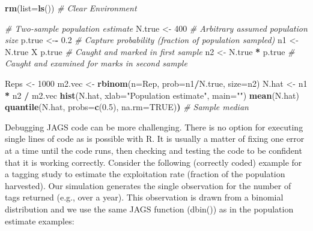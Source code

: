 \documentclass[
]{krantz}
\makeatletter
\newenvironment{Shaded}{\begin{snugshade}}{\end{snugshade}}
\newcommand{\AttributeTok}[1]{\textcolor[rgb]{0.27,0.27,0.27}{#1}}
\newcommand{\CommentTok}[1]{\textcolor[rgb]{0.37,0.37,0.37}{\textit{#1}}}
\newcommand{\ConstantTok}[1]{\textcolor[rgb]{0.37,0.37,0.37}{#1}}
\newcommand{\DecValTok}[1]{\textcolor[rgb]{0.06,0.06,0.06}{#1}}
\newcommand{\ErrorTok}[1]{\textcolor[rgb]{0.14,0.14,0.14}{\textbf{#1}}}
\newcommand{\FloatTok}[1]{\textcolor[rgb]{0.06,0.06,0.06}{#1}}
\newcommand{\FunctionTok}[1]{\textcolor[rgb]{0.27,0.27,0.27}{\textbf{#1}}}
\newcommand{\NormalTok}[1]{#1}
\newcommand{\OtherTok}[1]{\textcolor[rgb]{0.37,0.37,0.37}{#1}}
\newcommand{\SpecialCharTok}[1]{\textcolor[rgb]{0.43,0.43,0.43}{\textbf{#1}}}
\newcommand{\StringTok}[1]{\textcolor[rgb]{0.5,0.5,0.5}{#1}}
\newenvironment{kframe}{%
\medskip{}
\setlength{\fboxsep}{.8em}
 \def\at@end@of@kframe{}%
 \ifinner\ifhmode%
  \def\at@end@of@kframe{\end{minipage}}%
  \begin{minipage}{\columnwidth}%
 \fi\fi%
 \def\FrameCommand##1{\hskip\@totalleftmargin \hskip-\fboxsep
 \colorbox{shadecolor}{##1}\hskip-\fboxsep
     \hskip-\linewidth \hskip-\@totalleftmargin \hskip\columnwidth}%
 \MakeFramed {\advance\hsize-\width
   \@totalleftmargin\z@ \linewidth\hsize
   \@setminipage}}%
 {\par\unskip\endMakeFramed%
 \at@end@of@kframe}
\renewenvironment{Shaded}{\begin{kframe}}{\end{kframe}}
\makeatother
\begin{document}
\begin{Shaded}
\begin{Highlighting}[]
\FunctionTok{rm}\NormalTok{(}\AttributeTok{list=}\FunctionTok{ls}\NormalTok{()) }\CommentTok{\# Clear Environment}

\CommentTok{\# Two{-}sample population estimate}
\NormalTok{N.true }\OtherTok{\textless{}{-}} \DecValTok{400}  \CommentTok{\# Arbitrary assumed population size}
\NormalTok{p.true }\OtherTok{\textless{}{-}}\SpecialCharTok{{-}} \FloatTok{0.2} \CommentTok{\# Capture probability (fraction of population sampled)}
\NormalTok{n1 }\OtherTok{\textless{}{-}}\NormalTok{ N.true X p.true }\CommentTok{\# Caught and marked in first sample}
\NormalTok{n2 }\OtherTok{\textless{}{-}}\NormalTok{ N.true }\SpecialCharTok{*}\NormalTok{ p.true }\CommentTok{\# Caught and examined for marks in second sample}

\NormalTok{Reps }\OtherTok{\textless{}{-}} \DecValTok{1000}
\NormalTok{m2.vec }\OtherTok{\textless{}{-}} \FunctionTok{rbinom}\NormalTok{(}\AttributeTok{n=}\NormalTok{Rep, }\AttributeTok{prob=}\NormalTok{n1}\SpecialCharTok{/}\NormalTok{N.true, }\AttributeTok{size=}\NormalTok{n2)}
\NormalTok{N.hat }\OtherTok{\textless{}{-}}\NormalTok{ n1 }\SpecialCharTok{*}\NormalTok{ n2 }\SpecialCharTok{/}\NormalTok{ m2.vec}
\FunctionTok{hist}\NormalTok{(N.hat, }\AttributeTok{xlab=}\StringTok{"Population estimate"}\NormalTok{, }\AttributeTok{main=}\StringTok{""}\NormalTok{)}
\FunctionTok{mean}\NormalTok{(N.hat)}
\FunctionTok{quantile}\NormalTok{(N.hat, }\AttributeTok{probs=}\FunctionTok{c}\NormalTok{(}\FloatTok{0.5}\NormalTok{), }\AttributeTok{na.rm=}\ConstantTok{TRUE}\NormalTok{)}\ErrorTok{)}  \CommentTok{\# Sample median}
\end{Highlighting}
\end{Shaded}

Debugging JAGS code can be more challenging. There is no option for executing single lines of code as is possible with R. It is usually a matter of fixing one error at a time until the code runs, then checking and testing the code to be confident that it is working correctly. Consider the following (correctly coded) example for a tagging study to estimate the exploitation rate (fraction of the population harvested). Our simulation generates the single observation for the number of tags returned (e.g., over a year). This observation is drawn from a binomial distribution and we use the same JAGS function (dbin()) as in the population estimate examples:
\end{document}
